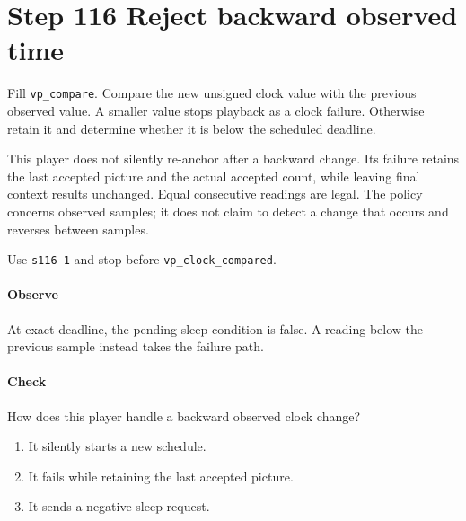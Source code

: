 \section{Step 116 Reject backward observed time}
Fill \texttt{vp\_compare}. Compare the new unsigned clock value with the previous observed value. A smaller value stops playback as a clock failure. Otherwise retain it and determine whether it is below the scheduled deadline.

This player does not silently re-anchor after a backward change. Its failure retains the last accepted picture and the actual accepted count, while leaving final context results unchanged. Equal consecutive readings are legal. The policy concerns observed samples; it does not claim to detect a change that occurs and reverses between samples.

Use \texttt{s116-1} and stop before \texttt{vp\_clock\_compared}.

\paragraph{Observe} At exact deadline, the pending-sleep condition is false. A reading below the previous sample instead takes the failure path.

\paragraph{Check} How does this player handle a backward observed clock change?
\begin{enumerate}[label=\Alph*.]
  \item It silently starts a new schedule.
  \item It fails while retaining the last accepted picture.
  \item It sends a negative sleep request.
\end{enumerate}
